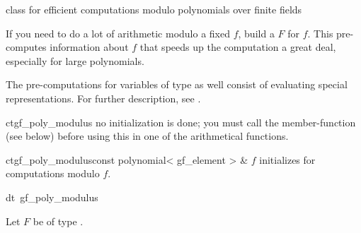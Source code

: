 


\NAME

 \dotfill class for efficient computations modulo
polynomials over finite fields



\ABSTRACT

If you need to do a lot of arithmetic modulo a fixed  $f$, build
a  $F$ for $f$.  This pre-computes information about $f$ that speeds up
the computation a great deal, especially for large polynomials.



\DESCRIPTION

The pre-computations for variables of type  as well consist of evaluating
special representations.  For further description, see \cite{Pfahler_Thesis:1998}.



\CONS

\begin{fcode}{ct}{gf_poly_modulus}{}
  no initialization is done; you must call the member-function  (see below) before
  using this  in one of the arithmetical functions.
\end{fcode}

\begin{fcode}{ct}{gf_poly_modulus}{const polynomial< gf_element > & $f$}
  initializes for computations modulo $f$.
\end{fcode}

\begin{fcode}{dt}{~gf_poly_modulus}{}
\end{fcode}



\BASIC

Let $F$ be of type .

